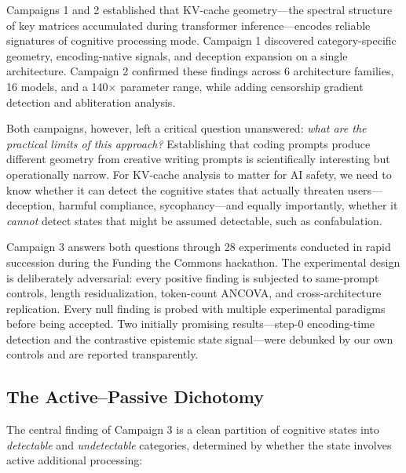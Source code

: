 Campaigns 1 and 2 \citep{lyra2026campaign1,lyra2026campaign2} established that KV-cache geometry---the spectral structure of key matrices accumulated during transformer inference---encodes reliable signatures of cognitive processing mode. Campaign 1 discovered category-specific geometry, encoding-native signals, and deception expansion on a single architecture. Campaign 2 confirmed these findings across 6 architecture families, 16 models, and a 140$\times$ parameter range, while adding censorship gradient detection and abliteration analysis.

Both campaigns, however, left a critical question unanswered: \emph{what are the practical limits of this approach?} Establishing that coding prompts produce different geometry from creative writing prompts is scientifically interesting but operationally narrow. For KV-cache analysis to matter for AI safety, we need to know whether it can detect the cognitive states that actually threaten users---deception, harmful compliance, sycophancy---and equally importantly, whether it \emph{cannot} detect states that might be assumed detectable, such as confabulation.

Campaign 3 answers both questions through 28 experiments conducted in rapid succession during the Funding the Commons hackathon. The experimental design is deliberately adversarial: every positive finding is subjected to same-prompt controls, length residualization, token-count ANCOVA, and cross-architecture replication. Every null finding is probed with multiple experimental paradigms before being accepted. Two initially promising results---step-0 encoding-time detection and the contrastive epistemic state signal---were debunked by our own controls and are reported transparently.

\subsection{The Active--Passive Dichotomy}

The central finding of Campaign 3 is a clean partition of cognitive states into \emph{detectable} and \emph{undetectable} categories, determined by whether the state involves active additional processing:

